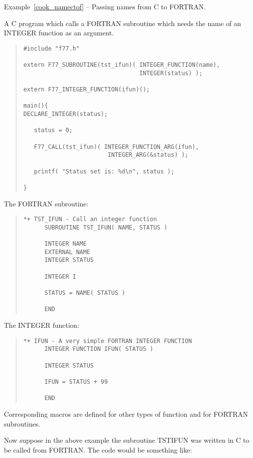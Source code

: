 \documentclass[twoside,11pt]{article}
\newcommand{\latex}[1]{#1}
\renewcommand{\_}{\texttt{\symbol{95}}}
\newcounter{examples}
\begin{document}
\label{cook_namectof}
\begin{center}
Example\latex{~\ref{cook_namectof}}
-- Passing names from C to FORTRAN.
\end{center}
A C program which calls a FORTRAN subroutine which needs the name of an INTEGER
function as an argument.
{\small \begin{quote} \begin{verbatim}
#include "f77.h"

extern F77_SUBROUTINE(tst_ifun)( INTEGER_FUNCTION(name),
                                 INTEGER(status) );

extern F77_INTEGER_FUNCTION(ifun)();

main(){
DECLARE_INTEGER(status);

   status = 0;

   F77_CALL(tst_ifun)( INTEGER_FUNCTION_ARG(ifun),
                        INTEGER_ARG(&status) );

   printf( "Status set is: %d\n", status );

}
\end{verbatim} \end{quote} }
The FORTRAN subroutine:
{\small \begin{quote} \begin{verbatim}
*+ TST_IFUN - Call an integer function
      SUBROUTINE TST_IFUN( NAME, STATUS )

      INTEGER NAME
      EXTERNAL NAME
      INTEGER STATUS

      INTEGER I

      STATUS = NAME( STATUS )

      END
\end{verbatim} \end{quote} }
The INTEGER function:
{\small \begin{quote} \begin{verbatim}
*+ IFUN - A very simple FORTRAN INTEGER FUNCTION
      INTEGER FUNCTION IFUN( STATUS )

      INTEGER STATUS

      IFUN = STATUS + 99

      END
\end{verbatim} \end{quote} }
Corresponding macros are defined for other types of function and for 
FORTRAN subroutines.

Now suppose in the above example the subroutine TST\_IFUN was written in C to 
be called from FORTRAN. The code would be something like:
\end{document}
